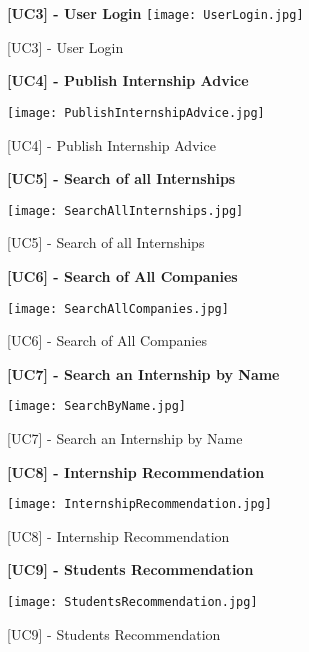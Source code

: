 			\begin{figure}[H]
				\centering
				{\bfseries [UC3] - User Login}
				\texttt{[image: UserLogin.jpg]}
				\caption{[UC3] - User Login}
				
			\end{figure}
			
			\begin{figure}[H]
				\centering
				{\bfseries [UC4] - Publish Internship Advice}
				\caption{[UC4] - Publish Internship Advice}
				\texttt{[image: PublishInternshipAdvice.jpg]}
				
				
			\end{figure}
			
		
			\begin{figure}[H]
				\centering
				{\bfseries [UC5] - Search of all Internships}
				\caption{[UC5] - Search of all Internships}
				\texttt{[image: SearchAllInternships.jpg]}
				
			\end{figure}
			
			\begin{figure}[H]
				\centering
				{\bfseries [UC6] - Search of All Companies}
				\caption{[UC6] - Search of All Companies}
				\texttt{[image: SearchAllCompanies.jpg]}
				
			\end{figure}
			
			\begin{figure}[H]
				\centering
				{\bfseries [UC7] - Search an Internship by Name}
				\caption{[UC7] - Search an Internship by Name}
				\texttt{[image: SearchByName.jpg]}
				
			\end{figure}
			
			\begin{figure}[H]
				\centering
				{\bfseries [UC8] - Internship Recommendation}
				\caption{[UC8] - Internship Recommendation}
				\texttt{[image: InternshipRecommendation.jpg]}
				
			\end{figure}
			
			\begin{figure}[H]
				\centering
				{\bfseries [UC9] - Students Recommendation}
				\caption{[UC9] - Students Recommendation}
				\texttt{[image: StudentsRecommendation.jpg]}
				
			\end{figure}
			
